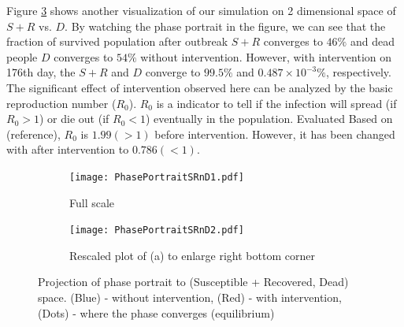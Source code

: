 %
%


%
%

Figure \ref{fig:PhasePortrait} shows another visualization of our simulation on 2 dimensional space of $S+R$ vs. $D$. By watching the phase portrait in the figure, we can see that the fraction of survived population after outbreak $S+R$ converges to $46\%$ and dead people $D$ converges to $54\%$ without intervention. However, with intervention on 176th day, the $S+R$ and $D$ converge to $99.5\%$ and $0.487 \times10^{-3}\%$, respectively. The significant effect of intervention observed here can be analyzed by the basic reproduction number ($R_0$). $R_0$ is a indicator to tell if the infection will spread (if $R_0>1$) or die out (if $R_0<1$) eventually in the population. Evaluated Based on (reference), $R_0$ is $1.99 (>1)$ before intervention. However, it has been changed with after intervention to $0.786(<1)$.


\begin{figure}[h!]
 \centering 
 \begin{subfigure}[b]{0.38\textwidth}
  \texttt{[image: PhasePortraitSRnD1.pdf]} \caption{Full scale} \label{fig:PhasePortraitA} \end{subfigure}
 \hspace{.1cm}
\begin{subfigure}[b]{0.38\textwidth}
 \texttt{[image: PhasePortraitSRnD2.pdf]} \caption{Rescaled plot of (a) to enlarge right bottom corner} \label{fiig:PhasePortraitB} \end{subfigure} 
\caption{Projection of phase portrait to (Susceptible + Recovered, Dead) space. (Blue) - without intervention, (Red) - with intervention, (Dots) - where the phase converges (equilibrium)}
\label{fig:PhasePortrait} 
\end{figure}


\clearpage




